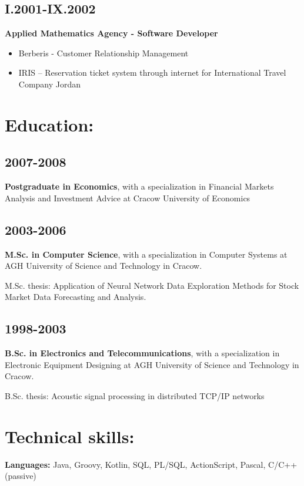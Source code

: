 \documentclass[11pt,a4paper]{article}
\begin{document}
\subsection*{I.2001-IX.2002}
\textbf{Applied Mathematics Agency - Software Developer}
\begin{itemize}
    \item Berberis - Customer Relationship Management
    \item IRIS -- Reservation ticket system through internet for International Travel Company Jordan
\end{itemize}

\section*{Education:}

\subsection*{2007-2008}
\textbf{Postgraduate in Economics}, with a specialization in Financial Markets Analysis and Investment Advice at Cracow University of Economics

\subsection*{2003-2006}
\textbf{M.Sc. in Computer Science}, with a specialization in Computer Systems at AGH University of Science and Technology in Cracow.

M.Sc. thesis: Application of Neural Network Data Exploration Methods for Stock Market Data Forecasting and Analysis.

\subsection*{1998-2003}
\textbf{B.Sc. in Electronics and Telecommunications}, with a specialization in Electronic Equipment Designing at AGH University of Science and Technology in Cracow.

B.Sc. thesis: Acoustic signal processing in distributed TCP/IP networks

\section*{Technical skills:}

\textbf{Languages:} Java, Groovy, Kotlin, SQL, PL/SQL, ActionScript, Pascal, C/C++ (passive)
\end{document}
